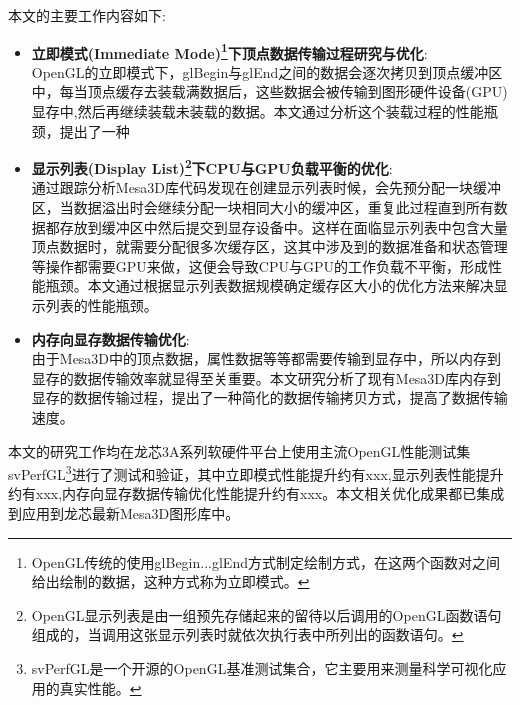 
本文的主要工作内容如下:

\begin{itemize}
\item{\textbf{立即模式(Immediate Mode)\footnote{OpenGL传统的使用glBegin...glEnd方式制定绘制方式，在这两个函数对之间给出绘制的数据，这种方式称为立即模式。}下顶点数据传输过程研究与优化}}: \\
OpenGL的立即模式下，glBegin与glEnd之间的数据会逐次拷贝到顶点缓冲区中，每当顶点缓存去装载满数据后，这些数据会被传输到图形硬件设备(GPU)显存中,然后再继续装载未装载的数据。本文通过分析这个装载过程的性能瓶颈，提出了一种
\item{\textbf{显示列表(Display List)\footnote{OpenGL显示列表是由一组预先存储起来的留待以后调用的OpenGL函数语句组成的，当调用这张显示列表时就依次执行表中所列出的函数语句。}下CPU与GPU负载平衡的优化}}: \\
通过跟踪分析Mesa3D库代码发现在创建显示列表时候，会先预分配一块缓冲区，当数据溢出时会继续分配一块相同大小的缓冲区，重复此过程直到所有数据都存放到缓冲区中然后提交到显存设备中。这样在面临显示列表中包含大量顶点数据时，就需要分配很多次缓存区，这其中涉及到的数据准备和状态管理等操作都需要GPU来做，这便会导致CPU与GPU的工作负载不平衡，形成性能瓶颈。本文通过根据显示列表数据规模确定缓存区大小的优化方法来解决显示列表的性能瓶颈。
\item{\textbf{内存向显存数据传输优化}}: \\
由于Mesa3D中的顶点数据，属性数据等等都需要传输到显存中，所以内存到显存的数据传输效率就显得至关重要。本文研究分析了现有Mesa3D库内存到显存的数据传输过程，提出了一种简化的数据传输拷贝方式，提高了数据传输速度。
\end{itemize}



本文的研究工作均在龙芯3A系列软硬件平台上使用主流OpenGL性能测试集svPerfGL\footnote{svPerfGL是一个开源的OpenGL基准测试集合，它主要用来测量科学可视化应用的真实性能。}进行了测试和验证，其中立即模式性能提升约有xxx,显示列表性能提升约有xxx,内存向显存数据传输优化性能提升约有xxx。本文相关优化成果都已集成到应用到龙芯最新Mesa3D图形库中。
